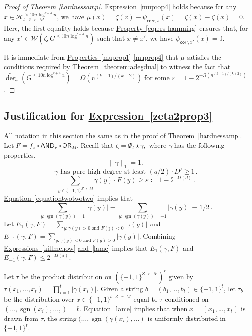 \documentclass[11pt]{article}
\numberwithin{equation}{section}
\theoremstyle{definition}
\theoremstyle{plain}
\newcommand{\expref}[2]{\hyperref[#2]{#1~\ref{#2}}}
\newcommand{\expeqref}[2]{\hyperref[#2]{#1~\eqref{#2}}}
\newcommand{\sgn}{\mathrm{sign}}
\newcommand{\OR}{\mathsf{ OR}}
\newcommand{\bits}{\{-1,1\}}
\newcommand{\ls}{\star}
\newcommand{\eps}{\varepsilon}
\newcommand{\adeg}{\widetilde{\operatorname{deg}}}
\newcommand{\AND}{\mathsf{AND}}
\renewcommand{\sgn}{\operatorname{sgn}}
\begin{document}
\begin{proof}[Proof of Theorem \ref{hardnessamp}]
	\expeqref{Expression}{muprop4} holds because for any $x \in \mathcal{H}_{t \cdot Z \cdot r \cdot M}^{> 10 n \log^{c+4} n}$, we have $\mu(x) = \zeta(x) - \psi_{\mathsf{corr}, x}(x) = \zeta(x) - \zeta(x) = 0$. Here, the first equality holds because \expeqref{Property}{eqn:rs-hamming} ensures that, for any $x' \in \mathcal{W}\left(\zeta, G^{\leq 10 n \log^{c+4} n}\right)$ such that $x \neq x'$, we have $\psi_{\mathsf{corr}, x'}(x)=0$. 
	
	It is immediate from \expeqref{Properties}{muprop1}-\eqref{muprop4} that $\mu$ %
	satisfies the conditions 
	 required by \expref{Theorem}{theorem:adegdual}
	to witness the fact that $\adeg_{\eps}(G^{\leq 10 n \log^{c+4} n})  = \Omega(n^{(k+1)/(k+2)})$ for some $\eps=1-2^{-\Omega(n^{(k+1)/(k+2)})}$. 
\end{proof}

\subsection{Justification for \expeqref{Expression}{zeta2prop3}}
\label{app:zeta2prop3}
All notation in this section the same as in the proof of \expref{Theorem}{hardnessamp}.
Let $F=f_z \circ \AND_r \circ \OR_M$.
Recall that $\zeta = \Phi_t \ls \gamma,$ where $\gamma$ 
has the following properties.
\begin{equation} \|\gamma\|_1=1\,.\end{equation}
\begin{equation} \gamma
\text{ has pure high degree at least } (d/2)\cdot D' \geq 1\,.\label{equationtwotwotwo}\end{equation}
\begin{equation} \sum_{y \in \bits^{Z \cdot r \cdot M}} \gamma(y) \cdot F(y) \geq \eps \coloneqq 1-2^{-\Omega(d)}\,.\label{killmenow}\end{equation}
\expeqref{Equation}{equationtwotwotwo} implies that 
\begin{equation}
\label{lame} \sum_{y \colon \sgn(\gamma(y))=1} |\gamma(y)| = \sum_{y \colon \sgn(\gamma(y))=-1} |\gamma(y)|=1/2\,.\end{equation}
Let $E_1(\gamma, F) = \sum_{y \colon \gamma(y) > 0 \text{ and } F(y) < 0} |\gamma(y)|$ and $E_{-1}(\gamma, F) = \sum_{y \colon \gamma(y) < 0 \text{ and } F(y) > 0} |\gamma(y)|$.
Combining \expeqref{Expressions}{killmenow} \expeqref{and}{lame}
implies that $E_{1}(\gamma, F)$ and $E_{-1}(\gamma, F) \leq 2^{-\Omega(d)}$. 

Let $\tau$ be the product distribution on $\left(\bits^{Z \cdot r \cdot M}\right)^t$
given by $\tau(x_1, \dots, x_t) = \prod_{i=1}^{t} |\gamma(x_i)|$. 
Given a string $b=(b_1, \dots, b_t) \in \bits^t$, let $\tau_b$ be the distribution over $x \in \bits^{t \cdot Z \cdot r \cdot M}$
equal to $\tau$ conditioned on $(\dots, \sgn(x_i), \dots, ) = b$. 
\expeqref{Equation}{lame} implies that when $x=(x_1, \dots, x_t)$ is drawn from $\tau$, the string $(\dots, \sgn(\gamma(x_i), \dots)$
is uniformly distributed in $\bits^t$. 
\end{document}
